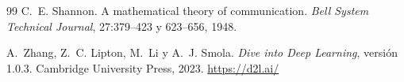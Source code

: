 \begin{thebibliography}{99}
C.~E. Shannon.
\newblock A mathematical theory of communication.
\newblock \emph{Bell System Technical Journal}, 27:379--423 y 623--656, 1948.

A.~Zhang, Z.~C. Lipton, M.~Li y A.~J. Smola.
\newblock \emph{Dive into Deep Learning}, versión 1.0.3.
\newblock Cambridge University Press, 2023.
\newblock \url{https://d2l.ai/}

\end{thebibliography}
